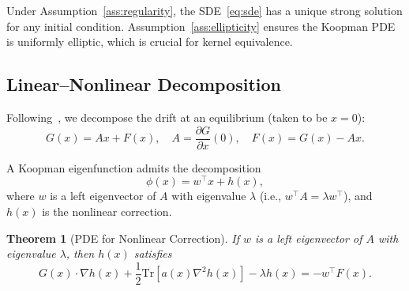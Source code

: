 \documentclass[11pt,a4paper]{article}
\newtheorem{theorem}{Theorem}[section]
\newcommand{\Tr}{\mathrm{Tr}}
\begin{document}
Under Assumption~\ref{ass:regularity}, the SDE~\eqref{eq:sde} has a unique strong solution for any initial condition. Assumption~\ref{ass:ellipticity} ensures the Koopman PDE is uniformly elliptic, which is crucial for kernel equivalence.

\subsection{Linear--Nonlinear Decomposition}

Following~\cite{Deka2023,HamziOwhadiVaidya2024}, we decompose the drift at an equilibrium (taken to be $x = 0$):
\begin{equation}
G(x) = Ax + F(x), \quad A = \frac{\partial G}{\partial x}(0), \quad F(x) = G(x) - Ax.
\end{equation}

A Koopman eigenfunction admits the decomposition
\begin{equation}\label{eq:eigenfunction_decomp}
\phi(x) = w^\top x + h(x),
\end{equation}
where $w$ is a left eigenvector of $A$ with eigenvalue $\lambda$ (i.e., $w^\top A = \lambda w^\top$), and $h(x)$ is the nonlinear correction.

\begin{theorem}[PDE for Nonlinear Correction]\label{thm:h_pde}
If $w$ is a left eigenvector of $A$ with eigenvalue $\lambda$, then $h(x)$ satisfies
\begin{equation}\label{eq:h_pde}
G(x) \cdot \nabla h(x) + \frac{1}{2} \Tr\left[a(x) \nabla^2 h(x)\right] - \lambda h(x) = -w^\top F(x).
\end{equation}
\end{theorem}
\end{document}
